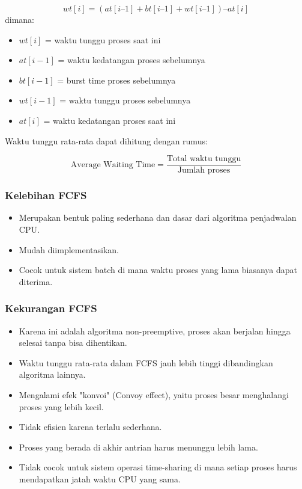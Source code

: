 \documentclass[12pt]{article}
\begin{document}
	\[
	wt[i] = (at[i–1] + bt[i–1] + wt[i–1]) – at[i]
	\]
	dimana:
	\begin{itemize}
		\item $wt[i]$ = waktu tunggu proses saat ini
		\item $at[i-1]$ = waktu kedatangan proses sebelumnya
		\item $bt[i-1]$ = burst time proses sebelumnya
		\item $wt[i-1]$ = waktu tunggu proses sebelumnya
		\item $at[i]$ = waktu kedatangan proses saat ini
	\end{itemize}
	
	Waktu tunggu rata-rata dapat dihitung dengan rumus:
	
	\[
	\text{Average Waiting Time} = \frac{\text{Total waktu tunggu}}{\text{Jumlah proses}}
	\]
	
	\subsubsection*{Kelebihan FCFS}
	\begin{itemize}
		\item Merupakan bentuk paling sederhana dan dasar dari algoritma penjadwalan CPU.
		\item Mudah diimplementasikan.
		\item Cocok untuk sistem batch di mana waktu proses yang lama biasanya dapat diterima.
	\end{itemize}
	
	\subsubsection*{Kekurangan FCFS}
	\begin{itemize}
		\item Karena ini adalah algoritma non-preemptive, proses akan berjalan hingga selesai tanpa bisa dihentikan.
		\item Waktu tunggu rata-rata dalam FCFS jauh lebih tinggi dibandingkan algoritma lainnya.
		\item Mengalami efek "konvoi" (Convoy effect), yaitu proses besar menghalangi proses yang lebih kecil.
		\item Tidak efisien karena terlalu sederhana.		
		\item Proses yang berada di akhir antrian harus menunggu lebih lama.		
		\item Tidak cocok untuk sistem operasi time-sharing di mana setiap proses harus mendapatkan jatah waktu CPU yang sama.	
	\end{itemize}
	
\end{document}
